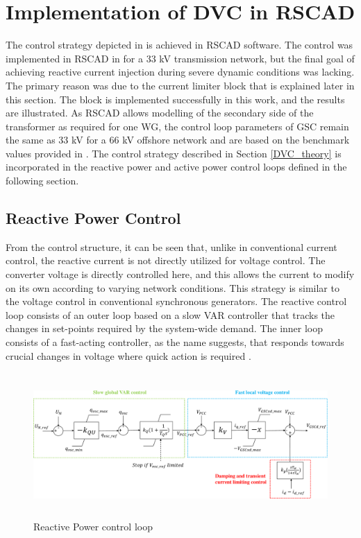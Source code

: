 \section{Implementation of DVC in RSCAD}\label{DVC_RSCAD}
The control strategy depicted in \cite{korai_dynamic_2019} is achieved in RSCAD software. The control was implemented in RSCAD in \cite{sethi_real-time_nodate-new} for a 33 kV transmission network, but the final goal of achieving reactive current injection during severe dynamic conditions was lacking. The primary reason was due to the current limiter block that is explained later in this section. The block is implemented successfully in this work, and the results are illustrated. 
As RSCAD allows modelling of the secondary side of the transformer as required for one \gls{WG}, the control loop parameters of \gls{GSC} remain the same as 33 kV for a 66 kV offshore network and are based on the benchmark values provided in \cite{korai_98_nodate}. The control strategy described in Section \ref{DVC_theory} is incorporated in the reactive power and active power control loops defined in the following section. 

\subsection{Reactive Power Control}
From the control structure, it can be seen that, unlike in conventional current control, the reactive current is not directly utilized for voltage control. The converter voltage is directly controlled here, and this allows the current to modify on its own according to varying network conditions. This strategy is similar to the voltage control in conventional synchronous generators. The reactive control loop consists of an outer loop based on a slow VAR controller that tracks the changes in set-points required by the system-wide demand. The inner loop consists of a fast-acting controller, as the name suggests, that responds towards crucial changes in voltage where quick action is required \cite{korai_dynamic_2019}.

\begin{figure}[H]
\centering
    \includegraphics[height = 5.5cm,width = 14.5cm]{Diagrams/Chapter_3/Reactive_power_loop.pdf}
    \caption{Reactive Power control loop \cite{korai_dynamic_2019}}
    \label{fig:Reactive_Power_Control_Loop}
\end{figure}

